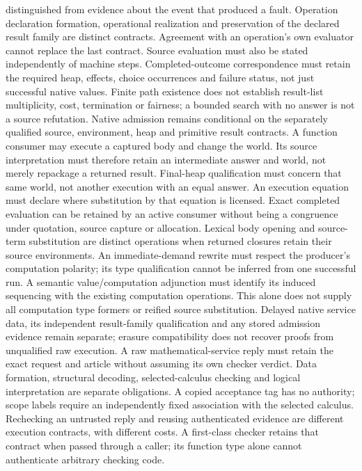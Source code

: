 \documentclass[11pt]{article}
\theoremstyle{definition}
\theoremstyle{remark}
\begin{document}
\begin{description}[leftmargin=1.2cm,style=nextline]
  distinguished from evidence about the event that produced a fault.
  Operation declaration formation, operational realization and preservation
  of the declared result family are distinct contracts. Agreement with an
  operation's own evaluator cannot replace the last contract.
  Source evaluation must also be stated independently of machine steps.
  Completed-outcome correspondence must retain the required heap, effects,
  choice occurrences and failure status, not just successful native values.
  Finite path existence does not establish result-list multiplicity, cost,
  termination or fairness; a bounded search with no answer is not a source
  refutation. Native admission remains conditional on the separately
  qualified source, environment, heap and primitive result contracts.
  A function consumer may execute a captured body and change the world.
  Its source interpretation must therefore retain an intermediate answer
  and world, not merely repackage a returned result. Final-heap qualification
  must concern that same world, not another execution with an equal answer.
  An execution equation must declare where substitution by that equation
  is licensed. Exact completed evaluation can be retained by an active
  consumer without being a congruence under quotation, source capture or
  allocation. Lexical body opening and source-term substitution are distinct
  operations when returned closures retain their source environments.
  An immediate-demand rewrite must respect the producer's computation
  polarity; its type qualification cannot be inferred from one successful run.
  A semantic value/computation adjunction must identify its induced sequencing
  with the existing computation operations. This alone does not supply all
  computation type formers or reified source substitution. Delayed native
  service data, its independent result-family qualification and any stored
  admission evidence remain separate; erasure compatibility does not recover
  proofs from unqualified raw execution.
  A raw mathematical-service reply must retain the exact request and article
  without assuming its own checker verdict. Data formation, structural
  decoding, selected-calculus checking and logical interpretation are
  separate obligations. A copied acceptance tag has no authority; scope
  labels require an independently fixed association with the selected
  calculus. Rechecking an untrusted reply and reusing authenticated evidence
  are different execution contracts, with different costs.
  A first-class checker retains that contract when passed through a caller;
  its function type alone cannot authenticate arbitrary checking code.

\end{description}
\end{document}
